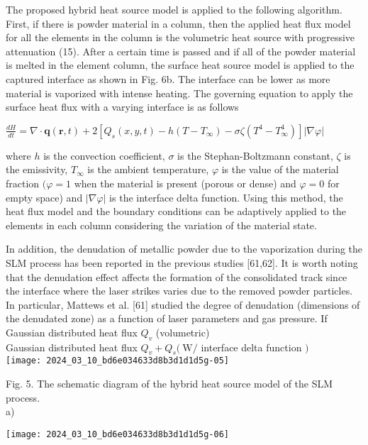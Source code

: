 \documentclass[10pt]{article}
\begin{document}
The proposed hybrid heat source model is applied to the following algorithm. First, if there is powder material in a column, then the applied heat flux model for all the elements in the column is the volumetric heat source with progressive attenuation (15). After a certain time is passed and if all of the powder material is melted in the element column, the surface heat source model is applied to the captured interface as shown in Fig. 6b. The interface can be lower as more material is vaporized with intense heating. The governing equation to apply the surface heat flux with a varying interface is as follows

$\frac{d H}{d t}=\nabla \cdot \boldsymbol{q}(\boldsymbol{r}, t)+2\left[Q_{s}(x, y, t)-h\left(T-T_{\infty}\right)-\sigma \zeta\left(T^{4}-T_{\infty}^{4}\right)\right]|\nabla \varphi|$

where $h$ is the convection coefficient, $\sigma$ is the Stephan-Boltzmann constant, $\zeta$ is the emissivity, $T_{\infty}$ is the ambient temperature, $\varphi$ is the value of the material fraction $(\varphi=1$ when the material is present (porous or dense) and $\varphi=0$ for empty space) and $|\nabla \varphi|$ is the interface delta function. Using this method, the heat flux model and the boundary conditions can be adaptively applied to the elements in each column considering the variation of the material state.

In addition, the denudation of metallic powder due to the vaporization during the SLM process has been reported in the previous studies [61,62]. It is worth noting that the denudation effect affects the formation of the consolidated track since the interface where the laser strikes varies due to the removed powder particles. In particular, Mattews et al. [61] studied the degree of denudation (dimensions of the denudated zone) as a function of laser parameters and gas pressure. If\\
Gaussian distributed heat flux $Q_{v}$ (volumetric)\\
Gaussian distributed heat flux $Q_{v}+Q_{s}(\mathrm{~W} /$ interface delta function $)$\\
\texttt{[image: 2024\_03\_10\_bd6e034633d8b3d1d1d5g-05]}

Fig. 5. The schematic diagram of the hybrid heat source model of the SLM process.\\
a)

\begin{center}
\texttt{[image: 2024\_03\_10\_bd6e034633d8b3d1d1d5g-06]}
\end{center}
\end{document}
